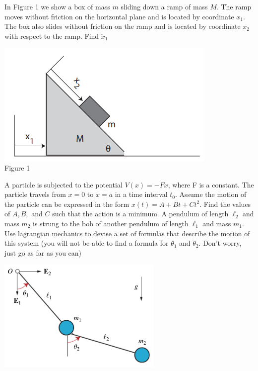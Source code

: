 \documentclass{exam}
\begin{document}
\begin{questions}
        \question In Figure 1 we show a box of mass $m$ sliding down a ramp of mass $M$. The ramp moves
without friction on the horizontal plane and is located by coordinate $x_1$. The box also slides without friction
on the ramp and is located by coordinate $x_2$ with respect to the ramp. Find $\ddot{x}_1$
        \begin{center}
            \includegraphics{../assets/figure1.png}\\
            Figure 1
        \end{center}\vspace{2in}
        \question A particle is subjected to the potential $V(x) = -Fx$, where F is a constant. The
particle travels from $x = 0$ to $x = a$ in a time interval $t_0$. Assume the motion of the
particle can be expressed in the form $x(t) = A + Bt + Ct^2$. Find the values of $A, B,$
and $C$ such that the action is a minimum. \vspace{2in}
        \question A pendulum of length $\ell_2$ and mass $m_2$ is strung to the bob of another pendulum of length $\ell_1$ and mass $m_1$. Use lagrangian mechanics to devise a set of formulas that describe the motion of this system (you will not be able to find a formula for $\theta_1$ and $\theta_2$. Don't worry, just go as far as you can)
        \begin{center}
            \includegraphics[width=300px]{../assets/double-pendulum.png}

\end{center}
\end{questions}
\end{document}
